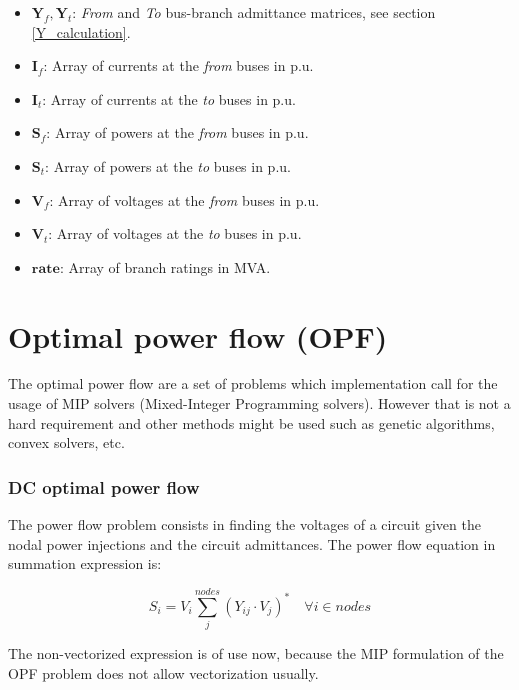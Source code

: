 \documentclass[a4paper,twoside,fleqn]{tufte-book}
\begin{document}
\begin{itemize}
	\item $\textbf{Y}_f, \textbf{Y}_t$: \textit{From} and \textit{To} bus-branch admittance matrices, see section \ref{Y_calculation}.
	\item $\textbf{I}_f$: Array of currents at the \textit{from} buses in p.u.
	\item $\textbf{I}_t$: Array of currents at the \textit{to} buses in p.u.
	\item $\textbf{S}_f$: Array of powers at the \textit{from} buses in p.u.
	\item $\textbf{S}_t$: Array of powers at the \textit{to} buses in p.u.
	\item $\textbf{V}_f$: Array of voltages at the \textit{from} buses in p.u.
	\item $\textbf{V}_t$: Array of voltages at the \textit{to} buses in p.u.
	\item $\textbf{rate}$: Array of branch ratings in MVA.
\end{itemize}



\chapter{Optimal power flow (OPF)}

The optimal power flow are a set of problems which implementation call for the usage of MIP solvers (Mixed-Integer Programming solvers). However that is not a hard requirement and other methods might be used such as genetic algorithms, convex solvers, etc.


\subsection{DC optimal power flow}

The power flow problem consists in finding the voltages of a circuit given the nodal power injections and the circuit admittances. The power flow equation in summation expression is:

\begin{equation}
S_i=V_i \sum_j^{nodes} \left(Y_{ij} \cdot V_j\right) ^* \quad  \forall i \in nodes
\end{equation}

The non-vectorized expression is of use now, because the MIP formulation of the OPF problem does not allow vectorization usually.
\end{document}
